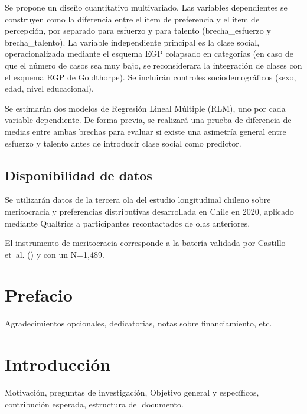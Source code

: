 \documentclass[
  spanish,
  a4paper,
  oneside]{scrbook}
\begin{document}
Se propone un diseño cuantitativo multivariado. Las variables
dependientes se construyen como la diferencia entre el ítem de
preferencia y el ítem de percepción, por separado para esfuerzo y para
talento (brecha\_esfuerzo y brecha\_talento). La variable independiente
principal es la clase social, operacionalizada mediante el esquema EGP
colapsado en categorías (en caso de que el número de casos sea muy bajo,
se reconsiderara la integración de clases con el esquema EGP de
Goldthorpe). Se incluirán controles sociodemográficos (sexo, edad, nivel
educacional).

Se estimarán dos modelos de Regresión Lineal Múltiple (RLM), uno por
cada variable dependiente. De forma previa, se realizará una prueba de
diferencia de medias entre ambas brechas para evaluar si existe una
asimetría general entre esfuerzo y talento antes de introducir clase
social como predictor.

\section{Disponibilidad de datos}\label{disponibilidad-de-datos}

Se utilizarán datos de la tercera ola del estudio longitudinal chileno
sobre meritocracia y preferencias distributivas desarrollada en Chile en
2020, aplicado mediante Qualtrics a participantes recontactados de olas
anteriores.

El instrumento de meritocracia corresponde a la batería validada por
Castillo et~al. () y
con un N=1,489.


\chapter*{Prefacio}\label{prefacio}


Agradecimientos opcionales, dedicatorias, notas sobre financiamiento,
etc.

\mainmatter


\chapter{Introducción}\label{introducciuxf3n}

Motivación, preguntas de investigación, Objetivo general y específicos,
contribución esperada, estructura del documento.
\end{document}
